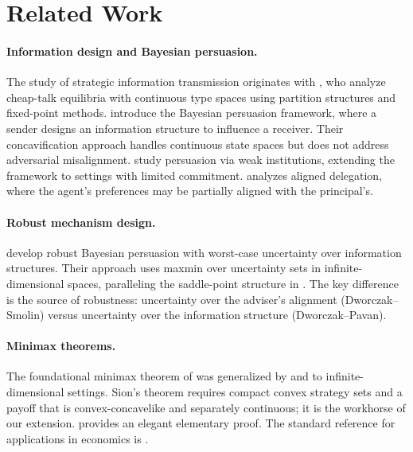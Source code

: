 \documentclass[11pt,a4paper]{article}
\theoremstyle{definition}
\begin{document}
\section{Related Work}
\label{sec:related}

\paragraph{Information design and Bayesian persuasion.}
The study of strategic information transmission originates with \citet{crawford1982strategic}, who analyze cheap-talk equilibria with continuous type spaces using partition structures and fixed-point methods.
\citet{kamenica2011bayesian} introduce the Bayesian persuasion framework, where a sender designs an information structure to influence a receiver.
Their concavification approach handles continuous state spaces but does not address adversarial misalignment.
\citet{lipnowski2022persuasion} study persuasion via weak institutions, extending the framework to settings with limited commitment.
\citet{frankel2014aligned} analyzes aligned delegation, where the agent's preferences may be partially aligned with the principal's.

\paragraph{Robust mechanism design.}
\citet{dworczak2022preparing} develop robust Bayesian persuasion with worst-case uncertainty over information structures.
Their approach uses maxmin over uncertainty sets in infinite-dimensional spaces, paralleling the saddle-point structure in \citet{dworczak2026robust}.
The key difference is the source of robustness: uncertainty over the adviser's alignment (Dworczak--Smolin) versus uncertainty over the information structure (Dworczak--Pavan).

\paragraph{Minimax theorems.}
The foundational minimax theorem of \citet{kneser1952minimax} was generalized by \citet{fan1952fixed,fan1953minimax} and \citet{sion1958general} to infinite-dimensional settings.
Sion's theorem requires compact convex strategy sets and a payoff that is convex-concavelike and separately continuous; it is the workhorse of our extension.
\citet{komiya1988elementary} provides an elegant elementary proof.
The standard reference for applications in economics is \citet{aliprantis2006infinite}.
\end{document}
